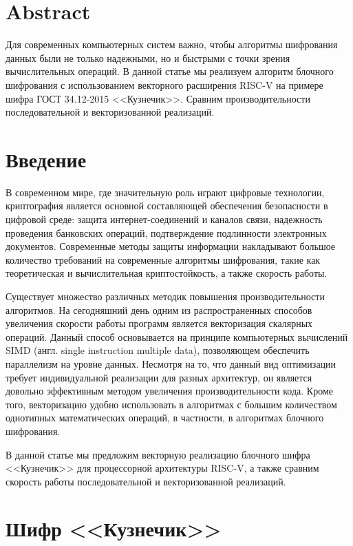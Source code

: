 \documentclass[a4paper, 12pt]{article}
\begin{document}
    

    \section{Abstract}
    Для современных компьютерных систем важно, чтобы алгоритмы шифрования данных были не
    только надежными, но и быстрыми с точки зрения вычислительных операций. В
    данной статье мы реализуем алгоритм блочного шифрования с использованием векторного
    расширения RISC-V на примере шифра ГОСТ 34.12-2015 <<Кузнечик>>. Сравним производительности последовательной и векторизованной реализаций.

    \section{Введение}

    В современном мире, где значительную роль играют цифровые технологии,
    криптография является основной составляющей обеспечения безопасности в цифровой
    среде: защита интернет-соединений и каналов связи, надежность проведения банковских
    операций, подтверждение подлинности электронных документов. Современные методы
    защиты информации накладывают большое количество требований на современные 
    алгоритмы шифрования, такие как теоретическая и вычислительная криптостойкость, а 
    также скорость работы.
    
    Существует множество различных методик повышения производительности алгоритмов. На 
    сегодняшний день одним из распространенных способов увеличения скорости работы программ является векторизация скалярных операций. Данный способ основывается на 
    принципе компьютерных вычислений SIMD (англ. single instruction multiple data), 
    позволяющем обеспечить параллелизм на уровне данных. Несмотря на то, что данный вид
    оптимизации требует индивидуальной реализации для разных архитектур, он является
    довольно эффективным методом увеличения производительности кода. Кроме того, векторизацию удобно использовать в алгоритмах с большим количеством однотипных математических
    операций, в частности, в алгоритмах блочного шифрования.

    В данной статье мы предложим векторную реализацию блочного шифра <<Кузнечик>> для 
    процессорной архитектуры RISC-V, а также сравним скорость работы
    последовательной и векторизованной реализаций.

    \section{Шифр <<Кузнечик>>}
\end{document}

